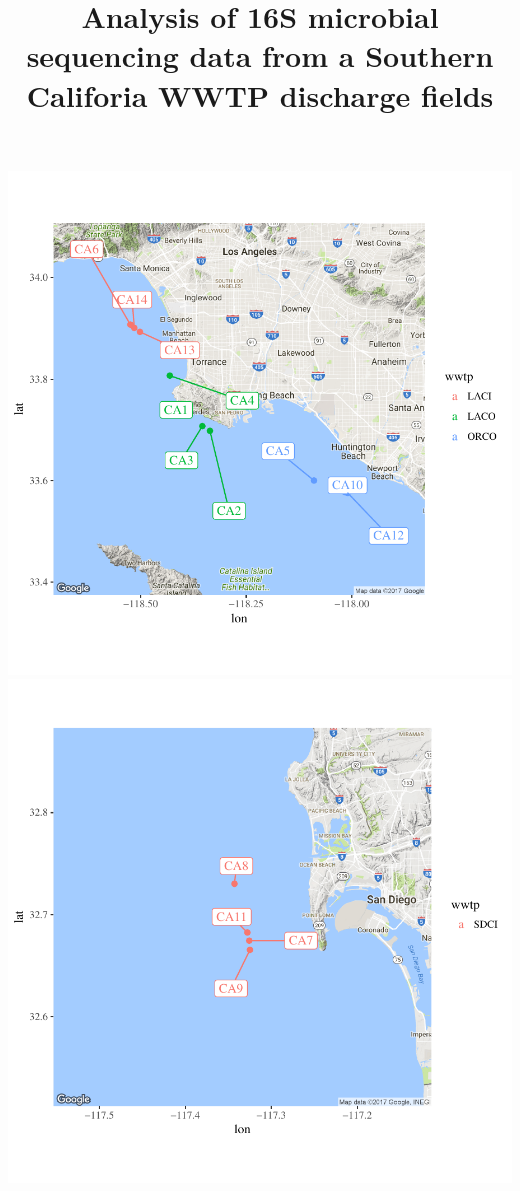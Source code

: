 \documentclass[letterpaper,12pt]{article}\usepackage[]{graphicx}\usepackage[]{color}
\makeatletter
\def\maxwidth{ %
  \ifdim\Gin@nat@width>\linewidth
    \linewidth
  \else
    \Gin@nat@width
  \fi
}
\newenvironment{knitrout}{}{} %
\makeatother
\begin{document}
\title{Analysis of 16S microbial sequencing data from a Southern Califoria WWTP discharge fields}
\maketitle

\begin{knitrout}
\color{fgcolor}

{\centering \includegraphics[width=\maxwidth]{figs/unnamed-chunk-2-1} 
\includegraphics[width=\maxwidth]{figs/unnamed-chunk-2-2} 

}



\end{knitrout}
\end{document}
